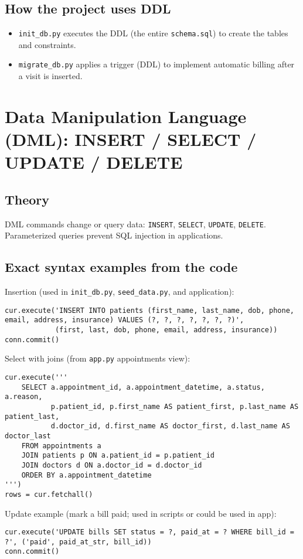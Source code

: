\documentclass[11pt,a4paper]{article}
\begin{document}
\subsection{How the project uses DDL}
\begin{itemize}
  \item \texttt{init_db.py} executes the DDL (the entire \texttt{schema.sql}) to create the tables and constraints.
  \item \texttt{migrate_db.py} applies a trigger (DDL) to implement automatic billing after a visit is inserted.
\end{itemize}

\section{Data Manipulation Language (DML): INSERT / SELECT / UPDATE / DELETE}
\subsection{Theory}
DML commands change or query data: \texttt{INSERT}, \texttt{SELECT}, \texttt{UPDATE}, \texttt{DELETE}. Parameterized queries prevent SQL injection in applications.

\subsection{Exact syntax examples from the code}
Insertion (used in \texttt{init_db.py}, \texttt{seed\_data.py}, and application):
\begin{lstlisting}
cur.execute('INSERT INTO patients (first_name, last_name, dob, phone, email, address, insurance) VALUES (?, ?, ?, ?, ?, ?, ?)',
            (first, last, dob, phone, email, address, insurance))
conn.commit()
\end{lstlisting}

Select with joins (from \texttt{app.py} appointments view):
\begin{lstlisting}
cur.execute('''
    SELECT a.appointment_id, a.appointment_datetime, a.status, a.reason,
           p.patient_id, p.first_name AS patient_first, p.last_name AS patient_last,
           d.doctor_id, d.first_name AS doctor_first, d.last_name AS doctor_last
    FROM appointments a
    JOIN patients p ON a.patient_id = p.patient_id
    JOIN doctors d ON a.doctor_id = d.doctor_id
    ORDER BY a.appointment_datetime
''')
rows = cur.fetchall()
\end{lstlisting}

Update example (mark a bill paid; used in scripts or could be used in app):
\begin{lstlisting}
cur.execute('UPDATE bills SET status = ?, paid_at = ? WHERE bill_id = ?', ('paid', paid_at_str, bill_id))
conn.commit()
\end{lstlisting}
\end{document}
